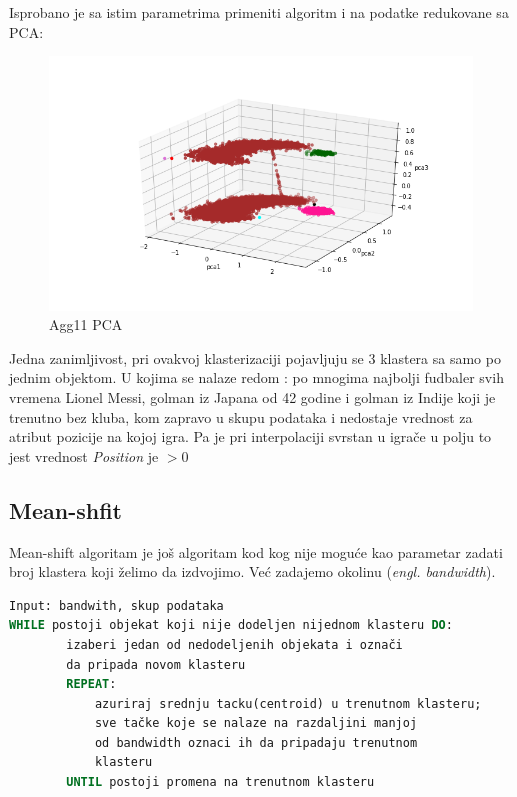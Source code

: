 \documentclass[a4paper, 11pt]{article}
\begin{document}
Isprobano je sa istim parametrima primeniti algoritm i na podatke 
redukovane sa PCA:

\begin{figure}[h]
\centering
\graphicspath{{../}}
\includegraphics[scale=0.45]{agglomerative_11_pca_3d.png}
\caption{Agg11 PCA}

\end{figure}
Jedna zanimljivost, pri ovakvoj klasterizaciji pojavljuju se 3 klastera sa samo 
po jednim objektom. U kojima se nalaze redom : po mnogima najbolji fudbaler
svih vremena Lionel Messi, golman iz Japana od 42 godine i golman iz Indije
koji je trenutno bez kluba, kom zapravo u skupu podataka i nedostaje vrednost
za atribut pozicije na kojoj igra. Pa je pri interpolaciji svrstan u igra\v{c}e
u polju to jest vrednost \emph{Position} je $  >0$  

\subsection{Mean-shfit}
Mean-shift algoritam je jo\v{s} algoritam kod kog nije mogu\'{c}e kao parametar
zadati broj klastera koji \v{z}elimo da izdvojimo. Ve\'{c} zadajemo okolinu
(\emph{engl. bandwidth}). \\

\begin{lstlisting}[language=Pascal]
Input: bandwith, skup podataka
WHILE postoji objekat koji nije dodeljen nijednom klasteru DO:
		izaberi jedan od nedodeljenih objekata i označi
		da pripada novom klasteru
		REPEAT:
			azuriraj srednju tacku(centroid) u trenutnom klasteru;
			sve tačke koje se nalaze na razdaljini manjoj
			od bandwidth oznaci ih da pripadaju trenutnom
			klasteru
		UNTIL postoji promena na trenutnom klasteru
\end{lstlisting}
\end{document}
